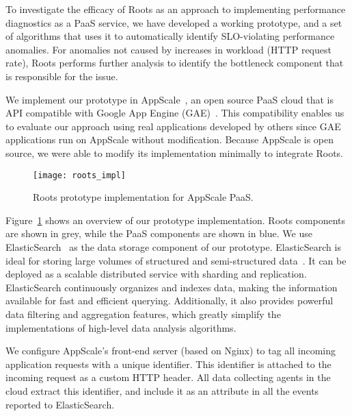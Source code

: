 To investigate the efficacy of Roots as an approach to
implementing performance diagnostics as a PaaS service, we have developed a
working prototype, and a set of algorithms that uses it to automatically
identify SLO-violating performance anomalies.  For anomalies not caused by increases
in workload (HTTP request rate), Roots performs further analysis to identify the
bottleneck component that is responsible for the issue.

We implement our prototype in AppScale~\cite{6488671}, an open source PaaS cloud 
that is API compatible with Google App Engine (GAE)~\cite{gae}. This compatibility enables
us to evaluate our approach using real applications developed by others since
GAE applications run on AppScale without modification.
Because AppScale is open source,
we were able to modify its implementation minimally to integrate 
Roots. 

\begin{figure}
\centering
\texttt{[image: roots\_impl]}
\caption{Roots prototype implementation for AppScale PaaS.}
\label{fig:roots_impl}
\end{figure}

Figure~\ref{fig:roots_impl} shows an overview of our prototype implementation. Roots components
are shown in grey, while the PaaS components are shown in blue.
We use ElasticSearch~\cite{elasticsearch} as the data storage component of our prototype. ElasticSearch is ideal 
for storing large volumes of structured and semi-structured data~\cite{Kononenko:2014:MMR:2597073.2597091}. 
It can be deployed as a scalable distributed service with sharding and replication.
ElasticSearch continuously organizes and indexes data, making the information available 
for fast and efficient querying. Additionally, it also provides
powerful data filtering and aggregation features, which greatly simplify the implementations of high-level
data analysis algorithms.

We configure AppScale's front-end server (based on Nginx) to tag all incoming application requests
with a unique identifier. This identifier is attached to the incoming request as a custom HTTP header.
All data collecting agents in the cloud extract this identifier, and include it as an attribute
in all the events reported to ElasticSearch. 

